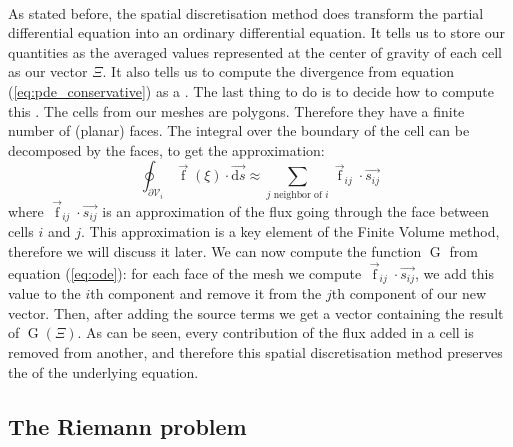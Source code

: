       \paragraph{}
      As stated before, the spatial discretisation method does transform the partial differential equation into an ordinary differential equation.
      It tells us to store our quantities as the averaged values represented at the center of gravity of each cell as our vector $\Xi$.
      It also tells us to compute the divergence from equation (\ref{eq:pde_conservative}) as a .
      The last thing to do is to decide how to compute this .
      The cells from our meshes are polygons.
      Therefore they have a finite number of (planar) faces.
      The integral over the boundary of the cell can be decomposed by the faces, to get the approximation:
      \begin{equation}
        \oint_{\partial\mathcal{V}_i} \vec{\operatorname{f}}\left(\xi\right) \cdot \vec{\mathrm{d}s} \approx \sum_{j\textrm{ neighbor of } i} \vec{\operatorname{f}}_{ij} \cdot \vec{s_{ij}}
      \end{equation}
      where $\vec{\operatorname{f}}_{ij} \cdot \vec{s_{ij}}$ is an approximation of the flux going through the face between cells $i$ and $j$.
      This approximation is a key element of the Finite Volume method, therefore we will discuss it later.
      We can now compute the function $\operatorname{G}$ from equation (\ref{eq:ode}): for each face of the mesh we compute $\vec{\operatorname{f}}_{ij} \cdot \vec{s_{ij}}$, we add this value to the $i$th component and remove it from the $j$th component of our new vector.
      Then, after adding the source terms we get a vector containing the result of $\operatorname{G}\left(\Xi\right)$.
      As can be seen, every contribution of the flux added in a cell is removed from another, and therefore this spatial discretisation method preserves the  of the underlying equation.


    \subsection{The Riemann problem}



